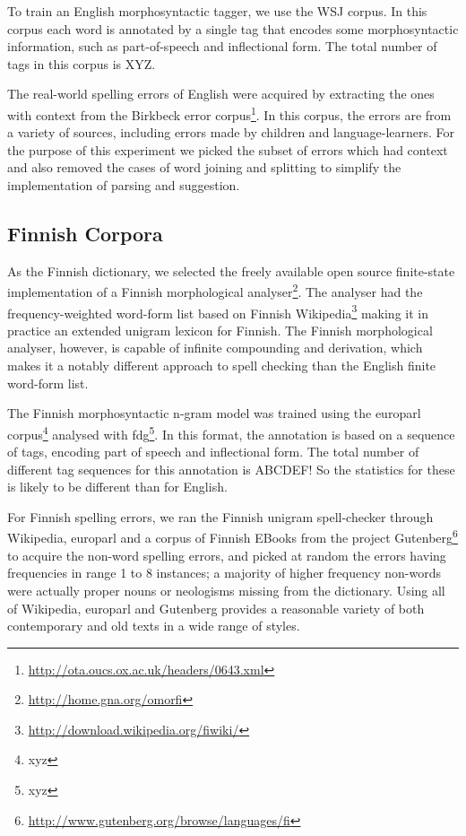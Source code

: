 \documentclass{llncs}
\begin{document}
To train an English morphosyntactic tagger, we use the WSJ corpus. In
this corpus each word is annotated by a single tag that encodes some
morphosyntactic information, such as part-of-speech and inflectional form. The
total number of tags in this corpus is XYZ.

The real-world spelling errors of English were acquired by extracting the ones
with context from the Birkbeck error
corpus\footnote{\url{http://ota.oucs.ox.ac.uk/headers/0643.xml}}. In this
corpus, the errors are from a variety of sources, including errors made by
children and language-learners. For the purpose of this experiment we picked
the subset of errors which had context and also removed the cases of
word joining and splitting to simplify the implementation of parsing and
suggestion.

\subsection{Finnish Corpora}

As the Finnish dictionary, we selected the freely available open source
finite-state implementation of a Finnish morphological
analyser\footnote{\url{http://home.gna.org/omorfi}}. The analyser had the
frequency-weighted word-form list based on Finnish
Wikipedia\footnote{\url{http://download.wikipedia.org/fiwiki/}} making it in
practice an extended unigram lexicon for Finnish. The Finnish morphological
analyser, however, is capable of infinite compounding and derivation, which
makes it a notably different approach to spell checking than the English finite
word-form list. 

The Finnish morphosyntactic n-gram model was trained using the europarl corpus\footnote{xyz}
analysed with fdg\footnote{xyz}. In this format, the annotation is based on a sequence of
tags, encoding part of speech and inflectional form. The total number of
different tag sequences for this annotation is ABCDEF! So  the
statistics for these is likely to be different than for English.

For Finnish spelling errors, we ran the Finnish unigram spell-checker through
Wikipedia, europarl and a corpus of Finnish EBooks from the project
Gutenberg\footnote{\url{http://www.gutenberg.org/browse/languages/fi}} to
acquire the non-word spelling errors, and picked at random the errors having
frequencies in range 1 to 8 instances; a majority of higher frequency non-words
were actually proper nouns or neologisms missing from the dictionary. Using all of
Wikipedia, europarl and Gutenberg provides a reasonable variety of both
contemporary and old texts in a wide range of styles.
\end{document}
